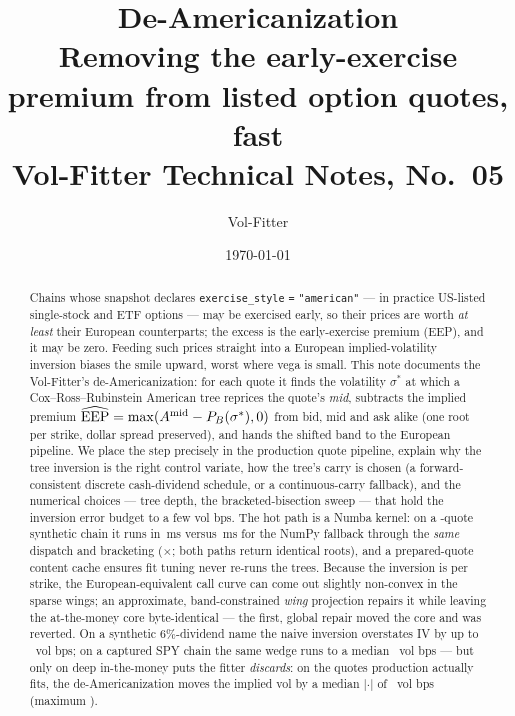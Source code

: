 \documentclass[11pt]{article}
\title{\textbf{De-Americanization}\\[2pt]
\large Removing the early-exercise premium from listed option quotes, fast\\[2pt]
\normalsize Vol-Fitter Technical Notes, No.~05}
\author{Vol-Fitter}
\date{\today}
\begin{document}
\maketitle

%
{}%
{\newcommand{\deamrealmedianitm}{519}\newcommand{\deamrealmaxbias}{814}%
 \newcommand{\deamrealnputs}{120}\newcommand{\deamrealnitm}{54}%
 \newcommand{\deamrealseln}{158}\newcommand{\deamrealselmedian}{-0.5}%
 \newcommand{\deamrealselabsmedian}{4.2}\newcommand{\deamrealselmax}{60}%
 \newcommand{\deamrealselputmedian}{3}\newcommand{\deamrealselputmax}{60}%
 \newcommand{\deamrealselcallmedian}{-2.1}\newcommand{\deamrealselcallmax}{1.9}}

\begin{abstract}
Chains whose snapshot declares \texttt{exercise\_style} \texttt{=} \texttt{"american"}
--- in practice US-listed single-stock and ETF options --- may be exercised early,
so their prices are worth \emph{at least} their European counterparts; the excess
is the early-exercise premium (EEP), and it may be zero. Feeding such prices
straight into a European implied-volatility inversion biases the smile upward,
worst where vega is small. This note documents the Vol-Fitter's
de-Americanization: for each quote it finds the volatility $\sigma^*$ at which a
Cox--Ross--Rubinstein American tree reprices the quote's \emph{mid}, subtracts the
implied premium $\widehat{\mathrm{EEP}}=\max(A^{\mathrm{mid}}-P_{B}(\sigma^*),0)$
from bid, mid and ask alike (one root per strike, dollar spread preserved), and
hands the shifted band to the European pipeline. We place the step precisely in
the production quote pipeline, explain why the tree inversion is the right
control variate, how the tree's carry is chosen (a forward-consistent discrete
cash-dividend schedule, or a continuous-carry fallback), and the numerical
choices --- tree depth, the bracketed-bisection sweep --- that hold the inversion
error budget to a few vol bps. The hot path is a Numba kernel: on a
\deamchainn-quote synthetic chain it runs in \deamnumbams\,ms versus
\deamnumpyms\,ms for the NumPy fallback through the \emph{same} dispatch and
bracketing (\deamspeedup$\times$; both paths return identical roots), and a
prepared-quote content cache ensures fit tuning never re-runs the trees. Because
the inversion is per strike, the European-equivalent call curve can come out
slightly non-convex in the sparse wings; an approximate, band-constrained
\emph{wing} projection repairs it while leaving the at-the-money core
byte-identical --- the first, global repair moved the core and was reverted. On a
synthetic $6\%$-dividend name the naive inversion overstates IV by up to
\deammaxbias\ vol bps; on a captured SPY chain the same wedge runs to a median
\deamrealmedianitm\ vol bps --- but only on deep in-the-money puts the fitter
\emph{discards}: on the quotes production actually fits, the de-Americanization
moves the implied vol by a median $|\cdot|$ of \deamrealselabsmedian\ vol bps
(maximum \deamrealselmax).
\end{abstract}
\end{document}
